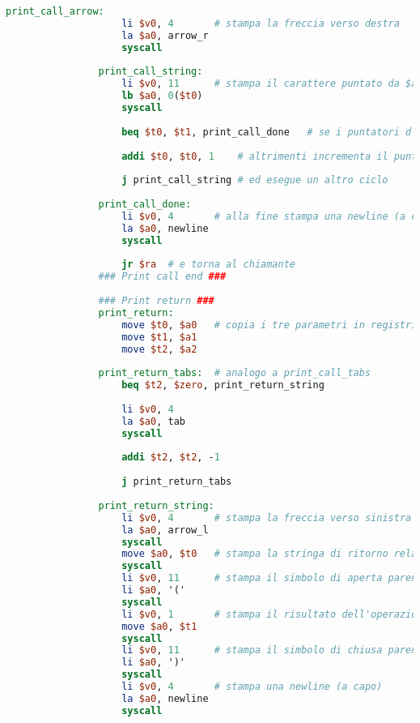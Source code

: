 \begin{center}
\begin{lstlisting}[language=mips, gobble=14, stepnumber=1]
                print_call_arrow:
                    li $v0, 4       # stampa la freccia verso destra
                    la $a0, arrow_r
                    syscall
                    
                print_call_string:
                    li $v0, 11      # stampa il carattere puntato da $a0
                    lb $a0, 0($t0)
                    syscall
                    
                    beq $t0, $t1, print_call_done   # se i puntatori d'inizio e di fine coincidono allora la stringa è finita
                    
                    addi $t0, $t0, 1    # altrimenti incrementa il puntatore d'inizio (scorre al prossimo carattere)
                    
                    j print_call_string # ed esegue un altro ciclo
                    
                print_call_done:
                    li $v0, 4       # alla fine stampa una newline (a capo)
                    la $a0, newline
                    syscall
                    
                    jr $ra  # e torna al chiamante
                ### Print call end ###
                
                ### Print return ###
                print_return:
                    move $t0, $a0   # copia i tre parametri in registri temporanei
                    move $t1, $a1
                    move $t2, $a2
                    
                print_return_tabs:  # analogo a print_call_tabs
                    beq $t2, $zero, print_return_string
                    
                    li $v0, 4
                    la $a0, tab
                    syscall
                    
                    addi $t2, $t2, -1
                    
                    j print_return_tabs
                    
                print_return_string:
                    li $v0, 4       # stampa la freccia verso sinistra
                    la $a0, arrow_l
                    syscall
                    move $a0, $t0   # stampa la stringa di ritorno relativa all'operazione
                    syscall
                    li $v0, 11      # stampa il simbolo di aperta parentesi
                    li $a0, '('
                    syscall
                    li $v0, 1       # stampa il risultato dell'operazione
                    move $a0, $t1
                    syscall
                    li $v0, 11      # stampa il simbolo di chiusa parentesi
                    li $a0, ')'
                    syscall
                    li $v0, 4       # stampa una newline (a capo)
                    la $a0, newline
                    syscall
                    

\end{lstlisting}
\end{center}
